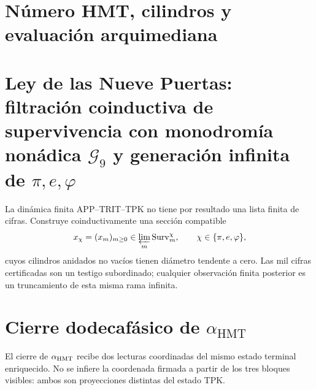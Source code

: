 \chapter{Número HMT, cilindros y evaluación arquimediana}
\label{chap:numero-cilindros-rev7}
\HMTDemoteHeadings



\HMTRestoreHeadings

\chapter[Ley de las Nueve Puertas y generación infinita]{Ley de las Nueve
Puertas: filtración coinductiva de supervivencia con monodromía nonádica
\texorpdfstring{\(\mathcal G_9\)}{G9} y generación infinita de
\texorpdfstring{\(\pi,e,\varphi\)}{pi, e y phi}}
\label{chap:generacion-constantes-rev7}
La dinámica finita APP--TRIT--TPK no tiene por resultado una lista finita de
cifras. Construye coinductivamente una sección compatible
\[
x_\chi=(x_m)_{m\geq0}\in
\varprojlim_m\operatorname{Surv}^{\chi}_m,
\qquad \chi\in\{\pi,e,\varphi\},
\]
cuyos cilindros anidados no vacíos tienen diámetro tendente a cero. Las mil
cifras certificadas son un testigo subordinado; cualquier observación finita
posterior es un truncamiento de esta misma rama infinita.
\HMTDemoteHeadings






\HMTRestoreHeadings

\chapter{Cierre dodecafásico de
\texorpdfstring{\(\alpha_{\mathrm{HMT}}\)}{alpha HMT}}
\label{chap:alpha-rev7}
El cierre de \(\alpha_{\rm HMT}\) recibe dos lecturas coordinadas del mismo
estado terminal enriquecido. No se infiere la coordenada firmada a partir de
los tres bloques visibles: ambos son proyecciones distintas del estado TPK.
\HMTDemoteHeadings


\HMTRestoreHeadings

